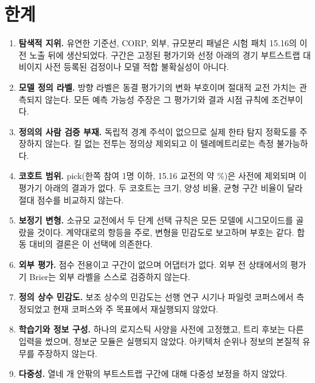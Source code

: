 \section{한계}
\label{sec:disc-limitations}

\begin{enumerate}[leftmargin=2em]
  \item \textbf{탐색적 지위.} 유연한 기준선, CORP, 외부, 규모분리 패널은 시험 패치 15.16의 이전 노출 뒤에 생산되었다. 구간은 고정된 평가기와 선정 아래의 경기 부트스트랩 대비이지 사전 등록된 검정이나 모델 적합 불확실성이 아니다.
  \item \textbf{모델 정의 라벨.} 방향 라벨은 동결 평가기의 변화 부호이며 절대적 교전 가치는 관측되지 않는다. 모든 예측 가능성 주장은 그 평가기와 결과 시점 규칙에 조건부이다.
  \item \textbf{정의의 사람 검증 부재.} 독립적 경계 주석이 없으므로 실제 한타 탐지 정확도를 주장하지 않는다. 킬 없는 전투는 정의상 제외되고 이 텔레메트리로는 측정 불가능하다.
  \item \textbf{코호트 범위.} pick(한쪽 참여 1명 이하, 15.16 교전의 약 \sharePickTest\%)은 사전에 제외되며 이 평가기 아래의 결과가 없다. 두 코호트는 크기, 양성 비율, 균형 구간 비율이 달라 절대 점수를 비교하지 않는다.
  \item \textbf{보정기 변형.} 소규모 교전에서 두 단계 선택 규칙은 모든 모델에 시그모이드를 골랐을 것이다. 계약대로의 항등을 주로, 변형을 민감도로 보고하며 부호는 같다. 합동 대비의 결론은 이 선택에 의존한다.
  \item \textbf{외부 평가.} 점수 전용이고 구간이 없으며 어댑터가 없다. 외부 전 상태에서의 평가기 Brier는 외부 라벨을 스스로 검증하지 않는다.
  \item \textbf{정의 상수 민감도.} 보조 상수의 민감도는 선행 연구 시기나 파일럿 코퍼스에서 측정되었고 현재 코퍼스와 주 목표에서 재실행되지 않았다.
  \item \textbf{학습기와 정보 구성.} 하나의 로지스틱 사양을 사전에 고정했고, 트리 후보는 다른 입력을 썼으며, 정보군 모듈은 실행되지 않았다. 아키텍처 순위나 정보의 본질적 유무를 주장하지 않는다.
  \item \textbf{다중성.} 열네 개 안팎의 부트스트랩 구간에 대해 다중성 보정을 하지 않았다.
\end{enumerate}
